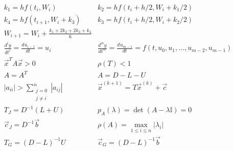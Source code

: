 \documentclass[12pt]{article}
\newcommand{\I}{\ensuremath{\mathbb{I}}}
\newcommand{\diff}[3]{\frac{d^{#3} #1}{d#2^{#3}}}
\begin{document}
\[\begin{array}{cc}
k_1  =  h f(t_i,W_i) & k_2  =  h f(t_i+h/2,W_i + k_1/2) \\
k_4  =  h f(t_{i+1},W_i + k_3) & k_3  =  h f(t_i+h/2,W_i + k_2/2)\\
 W_{i+1} = W_i + \frac{k_1+2k_2+2k_3+k_4}{6} & \\
\diff{y}{t}{i} = \diff{u_{i-1}}{t}{} = u_i & \diff{y}{t}{m} = \diff{u_{m-1}}{t}{} = f(t, u_0, u_1, \ldots, u_{m-2}, u_{m-1})\\
\vec{x}^T A\vec{x} > 0 & \rho(T) < 1 \\
A = A^T & A = D - L - U\\
|a_{ii}| > \sum\limits_{\substack{j=0\\j\neq i}}^n |a_{ij}| & \vec{x}^{(k+1)} = T\vec{x}^{(k)} + \vec{c}\\
T_J = D^{-1}(L+U) & p_A(\lambda) = \det(A-\lambda \I) = 0\\
\vec{c}_J = D^{-1}\vec{b} & \rho(A) = \max\limits_{1\leq i\leq n}|\lambda_i|\\
T_G = {(D-L)}^{-1}U & \vec{c}_G ={(D-L)}^{-1}\vec{b}
\end{array}\]
\end{document}
